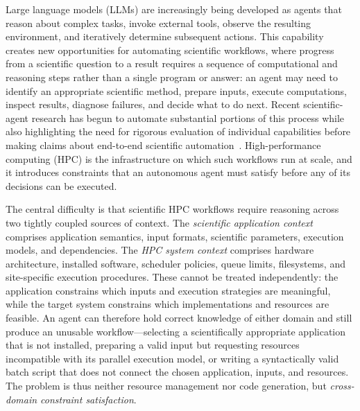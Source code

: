 \documentclass[conference]{IEEEtran}
\begin{document}
Large language models (LLMs) are increasingly being developed as agents that reason about complex tasks, invoke external tools, observe the resulting environment, and iteratively determine subsequent actions. This capability creates new opportunities for automating scientific workflows, where progress from a scientific question to a result requires a sequence of computational and reasoning steps rather than a single program or answer: an agent may need to identify an appropriate scientific method, prepare inputs, execute computations, inspect results, diagnose failures, and decide what to do next. Recent scientific-agent research has begun to automate substantial portions of this process while also highlighting the need for rigorous evaluation of individual capabilities before making claims about end-to-end scientific automation~\cite{chen2025scienceagentbench}. High-performance computing (HPC) is the infrastructure on which such workflows run at scale, and it introduces constraints that an autonomous agent must satisfy before any of its decisions can be executed.

The central difficulty is that scientific HPC workflows require reasoning across two tightly coupled sources of context. The \textit{scientific application context} comprises application semantics, input formats, scientific parameters, execution models, and dependencies. The \textit{HPC system context} comprises hardware architecture, installed software, scheduler policies, queue limits, filesystems, and site-specific execution procedures. These cannot be treated independently: the application constrains which inputs and execution strategies are meaningful, while the target system constrains which implementations and resources are feasible. An agent can therefore hold correct knowledge of either domain and still produce an unusable workflow---selecting a scientifically appropriate application that is not installed, preparing a valid input but requesting resources incompatible with its parallel execution model, or writing a syntactically valid batch script that does not connect the chosen application, inputs, and resources. The problem is thus neither resource management nor code generation, but \emph{cross-domain constraint satisfaction}.
\end{document}

